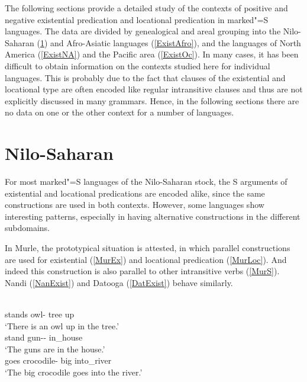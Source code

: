 The following sections provide a detailed study of the contexts of positive and negative existential predication and locational predication in marked"=S languages. 
The data are divided by genealogical and areal grouping into the Nilo-Saharan (\ref{ExistNilo}) and Afro-Asiatic languages (\ref{ExistAfro}), and the languages of North America (\ref{ExistNA}) and the Pacific area (\ref{ExistOc}). 
In many cases, it has been difficult to obtain information on the contexts studied here for individual languages. 
This is probably due to the fact that clauses of the existential and locational type are often encoded like regular intransitive clauses and thus are not explicitly discussed in many grammars. 
Hence, in the following sections there are no data on one or the other context for a number of languages.    

\section{Nilo-Saharan}\label{ExistNilo}

For most marked"=S languages of the Nilo-Saharan stock, the S arguments of existential and locational predications are encoded alike, since the same constructions are used in both contexts. However, some languages show interesting patterns, especially in having alternative constructions in the different subdomains.

In Murle, the prototypical situation is attested, in which parallel constructions are used for existential (\ref{MurEx}) and locational predication (\ref{MurLoc}). 
And indeed this construction is also parallel to other intransitive verbs (\ref{MurS}). 
Nandi (\ref{NanExist}) and Datooga (\ref{DatExist}) behave similarly.

\begin{exe}\ex\label{MurExist}
\begin{xlist}
\ex\label{MurEx} \gll {}   \\
stands owl-\nom{} tree up\\
\glt `There is an owl up in the tree.'
\ex\label{MurLoc}\gll{}  \\
stand gun-\pl{}-\nom{} in\_house\\
\glt `The guns are in the house.'
\ex\label{MurS}\gll{}    \\
goes crocodile-\nom{} \relativ{} big into\_river\\
\glt `The big crocodile goes into the river.'
\end{xlist}
\end{exe} 

